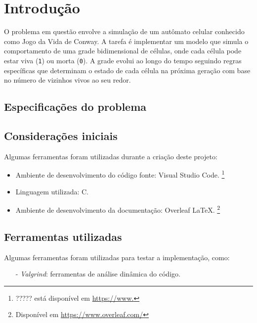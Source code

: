 \documentclass{article}
\begin{document}


\section{Introdução}


O problema em questão envolve a simulação de um autômato celular conhecido como Jogo da Vida de Conway. A tarefa é implementar um modelo que simula o comportamento de uma grade bidimensional de células, onde cada célula pode estar viva (\verb|1|) ou morta (\verb|0|). A grade evolui ao longo do tempo seguindo regras específicas que determinam o estado de cada célula na próxima geração com base no número de vizinhos vivos ao seu redor. 

\subsection{Especificações do problema}


\subsection{Considerações iniciais}

Algumas ferramentas foram utilizadas durante a criação deste projeto:

\begin{itemize}
  \item Ambiente de desenvolvimento do código fonte: Visual Studio Code. \footnote{????? está disponível em \url{https://www.}}
  \item Linguagem utilizada: C.
  \item Ambiente de desenvolvimento da documentação: Overleaf \LaTeX. \footnote{Disponível em \url{https://www.overleaf.com/}}
\end{itemize}

\subsection{Ferramentas utilizadas}
Algumas ferramentas foram utilizadas para testar a implementação, como:
\begin{itemize}
    \item[-] \textit{Valgrind}: ferramentas de análise dinâmica do código.
\end{itemize}
\end{document}

